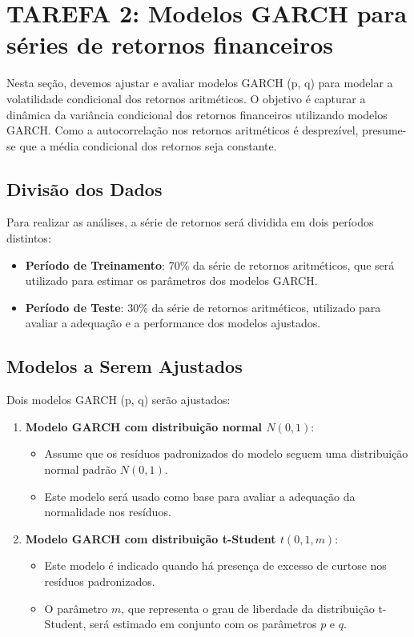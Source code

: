 \documentclass[a4paper, 12pt]{article}
\begin{document}
\section{TAREFA 2: Modelos GARCH para séries de retornos financeiros}

Nesta seção, devemos ajustar e avaliar modelos GARCH (p, q) para modelar a volatilidade condicional dos retornos aritméticos. O objetivo é capturar a dinâmica da variância condicional dos retornos financeiros utilizando modelos GARCH. Como a autocorrelação nos retornos aritméticos é desprezível, presume-se que a média condicional dos retornos seja constante.

\subsection{Divisão dos Dados}
Para realizar as análises, a série de retornos será dividida em dois períodos distintos:
\begin{itemize}
    \item \textbf{Período de Treinamento}: 70\% da série de retornos aritméticos, que será utilizado para estimar os parâmetros dos modelos GARCH.
    \item \textbf{Período de Teste}: 30\% da série de retornos aritméticos, utilizado para avaliar a adequação e a performance dos modelos ajustados.
\end{itemize}

\subsection{Modelos a Serem Ajustados}
Dois modelos GARCH (p, q) serão ajustados:
\begin{enumerate}
    \item \textbf{Modelo GARCH com distribuição normal \(N(0,1)\)}:
    \begin{itemize}
        \item Assume que os resíduos padronizados do modelo seguem uma distribuição normal padrão \(N(0,1)\).
        \item Este modelo será usado como base para avaliar a adequação da normalidade nos resíduos.
    \end{itemize}
    \item \textbf{Modelo GARCH com distribuição t-Student \(t(0,1,m)\)}:
    \begin{itemize}
        \item Este modelo é indicado quando há presença de excesso de curtose nos resíduos padronizados.
        \item O parâmetro \(m\), que representa o grau de liberdade da distribuição t-Student, será estimado em conjunto com os parâmetros \(p\) e \(q\).
    \end{itemize}
\end{enumerate}
\end{document}
